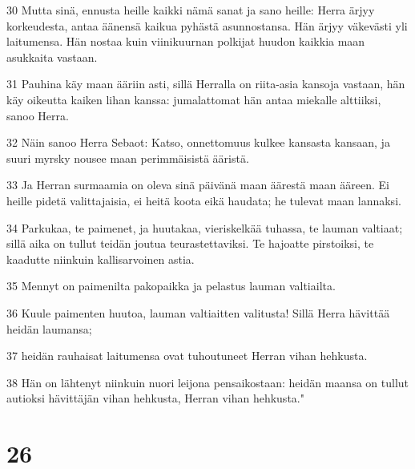\par 30 Mutta sinä, ennusta heille kaikki nämä sanat ja sano heille: Herra ärjyy korkeudesta, antaa äänensä kaikua pyhästä asunnostansa. Hän ärjyy väkevästi yli laitumensa. Hän nostaa kuin viinikuurnan polkijat huudon kaikkia maan asukkaita vastaan.
\par 31 Pauhina käy maan ääriin asti, sillä Herralla on riita-asia kansoja vastaan, hän käy oikeutta kaiken lihan kanssa: jumalattomat hän antaa miekalle alttiiksi, sanoo Herra.
\par 32 Näin sanoo Herra Sebaot: Katso, onnettomuus kulkee kansasta kansaan, ja suuri myrsky nousee maan perimmäisistä ääristä.
\par 33 Ja Herran surmaamia on oleva sinä päivänä maan äärestä maan ääreen. Ei heille pidetä valittajaisia, ei heitä koota eikä haudata; he tulevat maan lannaksi.
\par 34 Parkukaa, te paimenet, ja huutakaa, vieriskelkää tuhassa, te lauman valtiaat; sillä aika on tullut teidän joutua teurastettaviksi. Te hajoatte pirstoiksi, te kaadutte niinkuin kallisarvoinen astia.
\par 35 Mennyt on paimenilta pakopaikka ja pelastus lauman valtiailta.
\par 36 Kuule paimenten huutoa, lauman valtiaitten valitusta! Sillä Herra hävittää heidän laumansa;
\par 37 heidän rauhaisat laitumensa ovat tuhoutuneet Herran vihan hehkusta.
\par 38 Hän on lähtenyt niinkuin nuori leijona pensaikostaan: heidän maansa on tullut autioksi hävittäjän vihan hehkusta, Herran vihan hehkusta."

\chapter{26}

